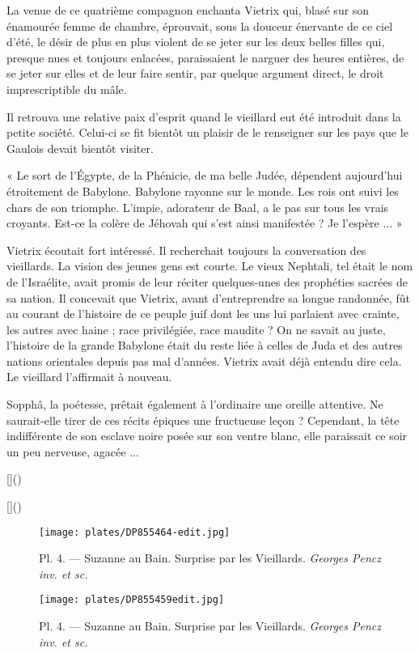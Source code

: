 \documentclass[a4paper, 11pt, oneside, polutonikogreek, french]{article}
\begin{document}
La venue de ce quatrième compagnon enchanta Vietrix qui, blasé sur son énamourée femme de chambre, éprouvait, sous la douceur énervante de ce ciel d'été, le désir de plus en plus violent de se jeter sur les deux belles filles qui, presque nues et toujours enlacées, paraissaient le narguer des heures entières, de se jeter sur elles et de leur faire sentir, par quelque argument direct, le droit imprescriptible du mâle.

\bigskip
\centerline{\EightStarTaper}
\centerline{\EightStarTaper\EightStarTaper}
\bigskip

Il retrouva une relative paix d'esprit quand le vieillard eut été introduit dans la petite société. Celui-ci se fit bientôt un plaisir de le renseigner sur les pays que le Gaulois devait bientôt visiter.

« Le sort de l'Égypte, de la Phénicie, de ma belle Judée, dépendent aujourd'hui étroitement de Babylone. Babylone rayonne sur le monde. Les rois ont suivi les chars de son triomphe. L'impie, adorateur de Baal, a le pas sur tous les vrais croyants. Est-ce la colère de Jéhovah qui s'est ainsi manifestée ? Je l'espère ... »

Vietrix écoutait fort intéressé. Il recherchait toujours la conversation des vieillards. La vision des jeunes gens est courte. Le vieux Nephtali, tel était le nom de l'Israélite, avait promis de leur réciter quelques-unes des prophéties sacrées de sa nation. Il concevait que Vietrix, avant d'entreprendre sa longue randonnée, fût au courant de l'histoire de ce peuple juif dont les uns lui parlaient avec crainte, les autres avec haine ; race privilégiée, race maudite ? On ne savait au juste, l'histoire de la grande Babylone était du reste liée à celles de Juda et des autres nations orientales depuis pas mal d'années. Vietrix avait déjà entendu dire cela. Le vieillard l'affirmait à nouveau.

Sopphâ, la poétesse, prêtait également à l'ordinaire une oreille attentive. Ne saurait-elle tirer de ces récits épiques une fructueuse leçon ? Cependant, la tête indifférente de son esclave noire posée sur son ventre blanc, elle paraissait ce soir un peu nerveuse, agacée ...

[]()

[]()
\clearpage
\vspace*{\fill}
\begin{figure}[H]
\centering
\texttt{[image: plates/DP855464-edit.jpg]}
\caption{Pl. 4. --- Suzanne au Bain. Surprise par les Vieillards. \emph{Georges Pencz inv. et sc.}}
\end{figure}
\vspace*{\fill}
\begin{figure}[H]
\centering
\texttt{[image: plates/DP855459edit.jpg]}
\caption{Pl. 4. --- Suzanne au Bain. Surprise par les Vieillards. \emph{Georges Pencz inv. et sc.}}
\end{figure}
\vspace*{\fill}
\clearpage
\end{document}
